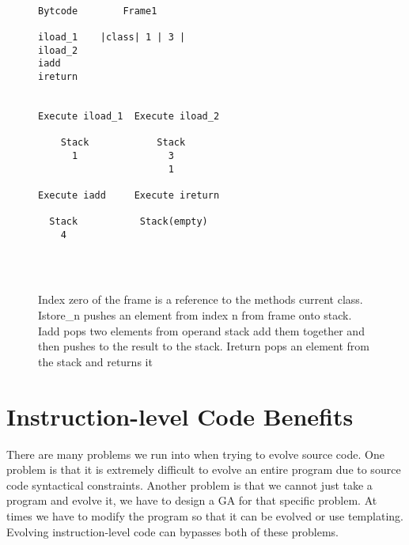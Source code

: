 \documentclass{sig-alternate}
\begin{document}
\begin{figure}
\centering
{\tt
\begin{verbatim}
Bytcode        Frame1  
           
iload_1	   |class| 1 | 3 |	
iload_2    
iadd       
ireturn


Execute iload_1  Execute iload_2   

    Stack            Stack            
      1                3               
                       1
                       
Execute iadd     Execute ireturn

  Stack           Stack(empty)
    4


          
\end{verbatim}
}
\caption{Index zero of the frame is a reference to the methods current class. Istore\_n pushes an element from index n from frame onto stack. Iadd pops two elements from operand stack add them together and then pushes to the result to the stack. Ireturn pops an element from the stack and returns it}
\end{figure}


\section{Instruction-level Code Benefits}

There are many problems we run into when trying to evolve source code. One problem is that it is extremely difficult to evolve an entire program due to source code syntactical constraints. Another problem is that we cannot just take a program and evolve it, we have to design a GA for that specific problem. At times we have to modify the program so that it can be evolved or use templating. Evolving instruction-level code can bypasses both of these problems.
\end{document}
